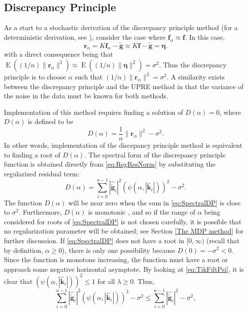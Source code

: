 \documentclass[12pt]{article}
\newcommand{\gnoise}{\widetilde{\mathbf{g}}}
\newcommand{\kdis}{\mathbf{k}}
\newcommand{\kmat}{K}	%
\newcommand{\fdis}{\mathbf{f}}
\newcommand{\regparam}{\alpha}
\newcommand{\freg}{\fdis_{\regparam}}	%
\newcommand{\mfilt}{\psi}
\newcommand{\noiseSD}{\sigma}	%
\newcommand{\noise}{\bm{\eta}}	%
\newcommand{\E}{\operatorname{E}}	%
\newcommand{\regres}{\mathbf{r}_{\regparam}}	%
\newcommand{\D}{D}	%
\begin{document}
\subsection{Discrepancy Principle} \label{sec:Discrepancy Principle}
As a start to a stochastic derivation of the discrepancy principle method (for a deterministic derivation, see \cite{Vogel:2002}), consider the case where $\freg \approx \fdis$. In this case,
\[\regres = \kmat\freg - \gnoise \approx \kmat\fdis - \gnoise = \noise.\]
with a direct consequence being that $\E((1/n)\|\regres\|^2) \approx \E((1/n)\|\noise\|^2) =\noiseSD^2$. Thus the discrepancy principle is to choose $\regparam$ such that $(1/n)\|\regres\|^2 = \noiseSD^2$. A similarity exists between the discrepancy principle and the UPRE method in that the variance of the noise in the data must be known for both methods. \par 
Implementation of this method requires finding a solution of $\D(\regparam) = 0$, where $\D(\regparam)$ is defined to be
\begin{equation}
\label{eq:DP}
\D(\regparam) = \frac{1}{n}\|\regres\|^2 - \noiseSD^2.
\end{equation}
In other words, implementation of the discepancy principle method is equivalent to finding a root of $\D(\regparam)$. The spectral form of the discrepancy principle function is obtained directly from \eqref{eq:RegResNorm} by substituting the regularized residual term:
\begin{equation}
\D(\regparam) = \sum_{i = 0}^{n-1} |\widehat{\gnoise}_i|^2(\mfilt(\regparam,|\widehat{\kdis}_i|))^2 - \noiseSD^2.
\label{eq:SpectralDP}
\end{equation}
The function $\D(\regparam)$ will be near zero when the sum in \eqref{eq:SpectralDP} is close to $\noiseSD^2$.  Furthermore, $\D(\regparam)$ is monotonic \cite{Vogel:2002}, and so if the range of $\regparam$ being considered for roots of \eqref{eq:SpectralDP} is not chosen carefully, it is possible that no regularization parameter will be obtained; see Section \ref{The MDP method} for further discussion. If \eqref{eq:SpectralDP} does not have a root in $[0,\infty)$ (recall that by definition, $\regparam \geq 0$), there is only one possibility because $\D(0) = -\noiseSD^2 < 0$. Since the function is monotone increasing, the function must have a root or approach some negative horizontal asymptote. By looking at \eqref{eq:TikFiltPsi}, it is clear that $(\mfilt(\regparam,|\widehat{\kdis}_i|))^2 \leq 1$ for all $\lambda \geq 0$. Thus,
\[\sum_{i = 0}^{n-1} |\widehat{\gnoise}_i|^2(\mfilt(\regparam,|\widehat{\kdis}_i|))^2 - \noiseSD^2 \leq \sum_{i = 0}^{n-1} |\widehat{\gnoise}_i|^2 - \noiseSD^2,\]
\end{document}
